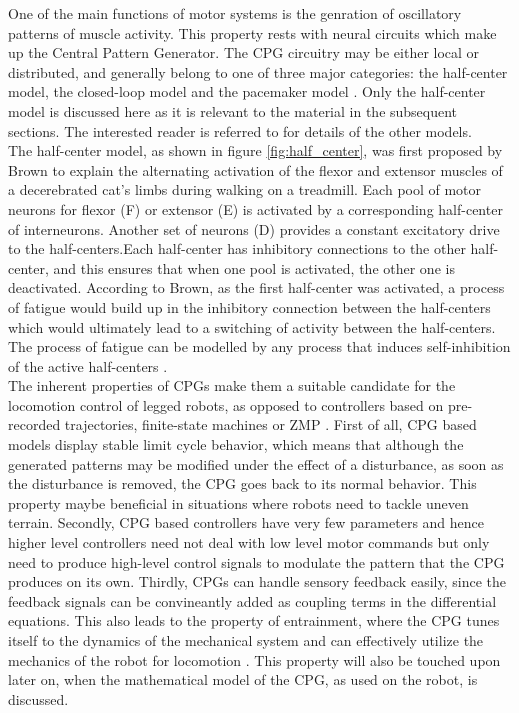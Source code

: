 \documentclass[12pt,twoside]{article}
\theoremstyle{plain}
\theoremstyle{definition}
\theoremstyle{remark}
\newcommand{\forceindent}{\leavevmode{\parindent=2em\indent}}
\begin{document}
\forceindent One of the main functions of motor systems is the genration of oscillatory patterns of muscle activity. This property rests with neural circuits which make up the Central Pattern Generator. The CPG circuitry may be either local or distributed, and generally belong to one of three major categories: the half-center model, the closed-loop model and the pacemaker model \cite{neurobiology1994shepherd}. Only the half-center model is discussed here as it is relevant to the material in the subsequent sections. The interested reader is referred to \cite{neurobiology1994shepherd} for details of the other models.\\
\forceindent The half-center model, as shown in figure \ref{fig:half_center}, was first proposed by Brown \cite{brown1914nature} to explain the alternating activation of the flexor and extensor muscles of a decerebrated cat's limbs during walking on a treadmill. Each pool of motor neurons for flexor (F) or extensor (E) is activated by a corresponding half-center of interneurons. Another set of neurons (D) provides a constant excitatory drive to the half-centers.Each half-center has inhibitory connections to the other half-center, and this ensures that when one pool is activated, the other one is deactivated. According to Brown, as the first half-center was activated, a process of fatigue would build up in the inhibitory connection between the half-centers which would ultimately lead to a switching of activity between the half-centers. The process of fatigue can be modelled by any process that induces self-inhibition of the active half-centers \cite{neurobiology1994shepherd}.\\
\forceindent The inherent properties of CPGs make them a suitable candidate for the locomotion control of legged robots, as opposed to controllers based on pre-recorded trajectories, finite-state machines or ZMP \cite{Ijspeert2008}. First of all, CPG based models display stable limit cycle behavior, which means that although the generated patterns may be modified under the effect of a disturbance, as soon as the disturbance is removed, the CPG goes back to its normal behavior. This property maybe beneficial in situations where robots need to tackle uneven terrain. Secondly, CPG based controllers have very few parameters and hence higher level controllers need not deal with low level motor commands but only need to produce high-level control signals to modulate the pattern that the CPG produces on its own. Thirdly, CPGs can handle sensory feedback easily, since the feedback signals can be convineantly added as coupling terms in the differential equations. This also leads to the property of entrainment, where the CPG tunes itself to the dynamics of the mechanical system and can effectively utilize the mechanics of the robot for locomotion \cite{Ijspeert2008}. This property will also be touched upon later on, when the mathematical model of the CPG, as used on the robot, is discussed.
\end{document}
